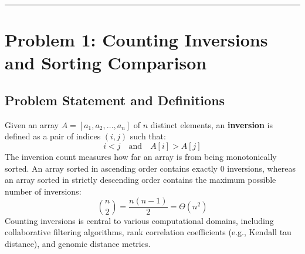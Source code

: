 \documentclass[12pt]{article}
\begin{document}
\hrule
\vspace{0.3cm}

\section{Problem 1: Counting Inversions and Sorting Comparison}

\subsection{Problem Statement and Definitions}
Given an array $A = [a_1, a_2, \dots, a_n]$ of $n$ distinct elements, an \textbf{inversion} is defined as a pair of indices $(i, j)$ such that:
\begin{equation}
    i < j \quad \text{and} \quad A[i] > A[j]
\end{equation}
The inversion count measures how far an array is from being monotonically sorted. An array sorted in ascending order contains exactly $0$ inversions, whereas an array sorted in strictly descending order contains the maximum possible number of inversions:
\begin{equation}
    \binom{n}{2} = \frac{n(n-1)}{2} = \Theta(n^2)
\end{equation}
Counting inversions is central to various computational domains, including collaborative filtering algorithms, rank correlation coefficients (e.g., Kendall tau distance), and genomic distance metrics.
\end{document}
